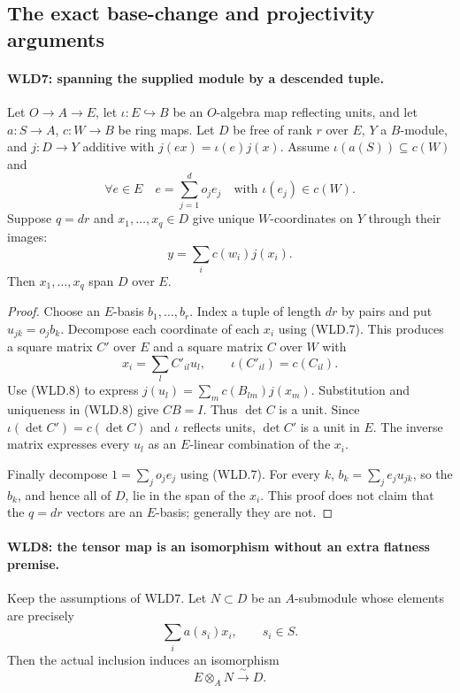 \documentclass[11pt,a4paper]{article}
\numberwithin{equation}{section}
\theoremstyle{remark}\newtheorem{remark}[theorem]{Remark}
\begin{document}
\subsection{The exact base-change and projectivity arguments}

\paragraph{WLD7: spanning the supplied module by a descended tuple.}
\label{claim:WLD7}
Let $O\to A\to E$, let $\iota:E\hookrightarrow B$ be an $O$-algebra
map reflecting units, and let $a:S\to A$, $c:W\to B$ be ring maps.
Let $D$ be free of rank $r$ over $E$, $Y$ a $B$-module, and
$j:D\to Y$ additive with $j(ex)=\iota(e)j(x)$. Assume
$\iota(a(S))\subseteq c(W)$ and
\[
 \forall e\in E\quad
 e=\sum_{j=1}^d o_je_j\quad\text{with }\iota(e_j)\in c(W).
                                                               \tag{WLD.7}
\]
Suppose $q=dr$ and $x_1,\ldots,x_q\in D$ give unique $W$-coordinates
on $Y$ through their images:
\[
                    y=\sum_i c(w_i)j(x_i).
                                                               \tag{WLD.8}
\]
Then $x_1,\ldots,x_q$ span $D$ over $E$.

\begin{proof}
Choose an $E$-basis $b_1,\ldots,b_r$. Index a tuple of length $dr$
by pairs and put $u_{jk}=o_jb_k$. Decompose each coordinate of
each $x_i$ using (WLD.7). This produces a square matrix $C'$ over
$E$ and a square matrix $C$ over $W$ with
\[
             x_i=\sum_l C'_{il}u_l,\qquad
                         \iota(C'_{il})=c(C_{il}).
\]
Use (WLD.8) to express $j(u_l)=\sum_m c(B_{lm})j(x_m)$.
Substitution and uniqueness in (WLD.8) give $CB=I$.
Thus $\det C$ is a unit. Since
$\iota(\det C')=c(\det C)$ and $\iota$ reflects units,
$\det C'$ is a unit in $E$. The inverse matrix expresses every
$u_l$ as an $E$-linear combination of the $x_i$.

Finally decompose $1=\sum_j o_je_j$ using (WLD.7). For every $k$,
$b_k=\sum_j e_ju_{jk}$, so the $b_k$, and hence all of $D$, lie
in the span of the $x_i$. This proof does not claim that the
$q=dr$ vectors are an $E$-basis; generally they are not.
\end{proof}

\paragraph{WLD8: the tensor map is an isomorphism without an extra flatness premise.}
\label{claim:WLD8}
Keep the assumptions of WLD7. Let $N\subset D$ be an $A$-submodule
whose elements are precisely
\[
                        \sum_i a(s_i)x_i,\qquad s_i\in S.
                                                               \tag{WLD.9}
\]
Then the actual inclusion induces an isomorphism
\[
                         E\otimes_AN\xrightarrow{\ \sim\ }D.
                                                               \tag{WLD.10}
\]
\end{document}
